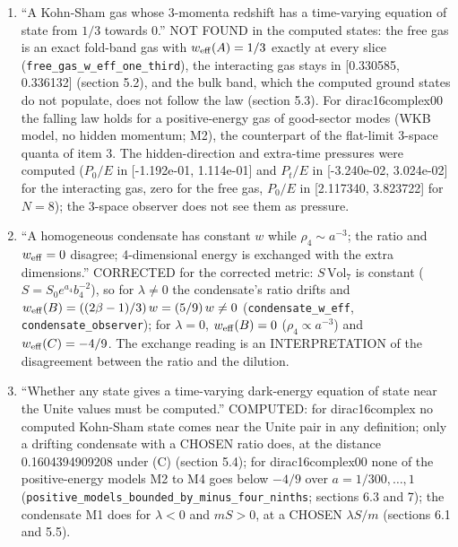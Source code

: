 \documentclass[11pt]{article}
\begin{document}
\begin{enumerate}
\item ``A Kohn-Sham gas whose 3-momenta redshift has a time-varying equation of state from $1/3$ towards 0.'' NOT FOUND in the computed states: the free gas is an exact fold-band gas with $w_{\rm eff}(A) = 1/3$ exactly at every slice (\texttt{free\_gas\allowbreak{}\_w\_eff\_o\allowbreak{}ne\_third}), the interacting gas stays in [0.330585, 0.336132] (section 5.2), and the bulk band, which the computed ground states do not populate, does not follow the law (section 5.3). For dirac16complex00 the falling law holds for a positive-energy gas of good-sector modes (WKB model, no hidden momentum; M2), the counterpart of the flat-limit 3-space quanta of item 3. The hidden-direction and extra-time pressures were computed ($P_0/E$ in [-1.192e-01, 1.114e-01] and $P_t/E$ in [-3.240e-02, 3.024e-02] for the interacting gas, zero for the free gas, $P_0/E$ in [2.117340, 3.823722] for $N = 8$); the 3-space observer does not see them as pressure.
\item ``A homogeneous condensate has constant $w$ while $\rho_4 \sim a^{-3}$; the ratio and $w_{\rm eff} = 0$ disagree; 4-dimensional energy is exchanged with the extra dimensions.'' CORRECTED for the corrected metric: $S\,\mathrm{Vol}_7$ is constant ($S = S_0e^{a_4}b_4^{-2}$), so for $\lambda \neq 0$ the condensate's ratio drifts and $w_{\rm eff}(B) = ((2\beta - 1)/3)\,w = (5/9)\,w \neq 0$ (\texttt{condensa\allowbreak{}te\_w\_eff}, \texttt{condensa\allowbreak{}te\_obser\allowbreak{}ver}); for $\lambda = 0$, $w_{\rm eff}(B) = 0$ ($\rho_4 \propto a^{-3}$) and $w_{\rm eff}(C) = -4/9$. The exchange reading is an INTERPRETATION of the disagreement between the ratio and the dilution.
\item ``Whether any state gives a time-varying dark-energy equation of state near the Unite values must be computed.'' COMPUTED: for dirac16complex no computed Kohn-Sham state comes near the Unite pair in any definition; only a drifting condensate with a CHOSEN ratio does, at the distance 0.1604394909208 under (C) (section 5.4); for dirac16complex00 none of the positive-energy models M2 to M4 goes below $-4/9$ over $a = 1/300, \dots, 1$ (\texttt{positive\allowbreak{}\_models\_\allowbreak{}bounded\_\allowbreak{}by\_minus\allowbreak{}\_four\_ni\allowbreak{}nths}; sections 6.3 and 7); the condensate M1 does for $\lambda < 0$ and $mS > 0$, at a CHOSEN $\lambda S/m$ (sections 6.1 and 5.5).

\end{enumerate}
\end{document}
